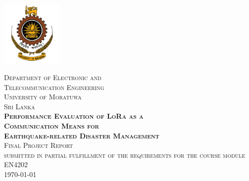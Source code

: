 \documentclass[12pt]{report}
\newcommand{\module}{EN4202} %
\begin{document}
\begin{titlepage}
	

	\centering
	\includegraphics[width=3cm]{logo.png}\\[1cm] %
	
	
	\newcommand{\HRule}{\rule{\linewidth}{0.5mm}} %
	
	
	\textsc{\LARGE Department of Electronic and } \\ [.5cm] 
	\textsc{\LARGE Telecommunication Engineering } \\[.75cm] 
	\textsc{\Large University of Moratuwa}\\[0.25cm]
	\textsc{\Large Sri Lanka}\\[3cm]
	
	
 \textbf{\textsc{\LARGE  Performance Evaluation of LoRa as a }} \\ [.2cm] 
 \textbf{\textsc{\LARGE  Communication Means for }} \\ [.2cm] 
 \textbf{\textsc{\LARGE  Earthquake-related Disaster Management }} \\ [1cm] 
 
 
 
	\textsc{\large Final Project Report}\\
	\textsc{submitted in partial fulfillment of the requirements
	for the course module \module}\\[0.25cm]
	{\large \textsc{\today}}\\[3cm] %
	


\end{titlepage}
\end{document}
